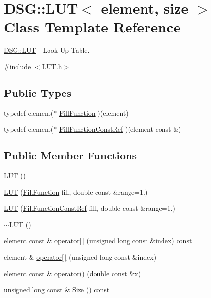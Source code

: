 \hypertarget{class_d_s_g_1_1_l_u_t}{\section{D\+S\+G\+:\+:L\+U\+T$<$ element, size $>$ Class Template Reference}
\label{class_d_s_g_1_1_l_u_t}
}


\hyperlink{class_d_s_g_1_1_l_u_t}{D\+S\+G\+::\+L\+U\+T} -\/ Look Up Table.  




{\ttfamily \#include $<$L\+U\+T.\+h$>$}

\subsection*{Public Types}
\begin{DoxyCompactItemize}
\item 
typedef element($\ast$ \hyperlink{class_d_s_g_1_1_l_u_t_af2436acdd3f277cc4cac77c3c07cb4ca}{Fill\+Function} )(element)
\item 
typedef element($\ast$ \hyperlink{class_d_s_g_1_1_l_u_t_a69e1198a9a193fee92d676d33ffd3d66}{Fill\+Function\+Const\+Ref} )(element const \&)
\end{DoxyCompactItemize}
\subsection*{Public Member Functions}
\begin{DoxyCompactItemize}
\item 
\hyperlink{class_d_s_g_1_1_l_u_t_a9d172f92fe9ea296efce54c9d7f8fdcc}{L\+U\+T} ()
\item 
\hyperlink{class_d_s_g_1_1_l_u_t_a68a44636b54a8c1b45c06e0f052d9288}{L\+U\+T} (\hyperlink{class_d_s_g_1_1_l_u_t_af2436acdd3f277cc4cac77c3c07cb4ca}{Fill\+Function} fill, double const \&range=1.)
\item 
\hyperlink{class_d_s_g_1_1_l_u_t_a88a213f672036c37ee7cd772cadceb3c}{L\+U\+T} (\hyperlink{class_d_s_g_1_1_l_u_t_a69e1198a9a193fee92d676d33ffd3d66}{Fill\+Function\+Const\+Ref} fill, double const \&range=1.)
\item 
\hyperlink{class_d_s_g_1_1_l_u_t_ad939097dc1474825c7aa5ef2c427de4d}{$\sim$\+L\+U\+T} ()
\item 
element const \& \hyperlink{class_d_s_g_1_1_l_u_t_ac6291c79e92f1e538151f3be4bcd334c}{operator\mbox{[}$\,$\mbox{]}} (unsigned long const \&index) const 
\item 
element \& \hyperlink{class_d_s_g_1_1_l_u_t_a734b7df17863591034393060d06db33d}{operator\mbox{[}$\,$\mbox{]}} (unsigned long const \&index)
\item 
element const \& \hyperlink{class_d_s_g_1_1_l_u_t_ab5cc091d7d74bda3fa09f6deabe15358}{operator()} (double const \&x)
\item 
unsigned long const \& \hyperlink{class_d_s_g_1_1_l_u_t_a2d1a2112f9e960c7b70882a19d670ff9}{Size} () const 
\end{DoxyCompactItemize}
